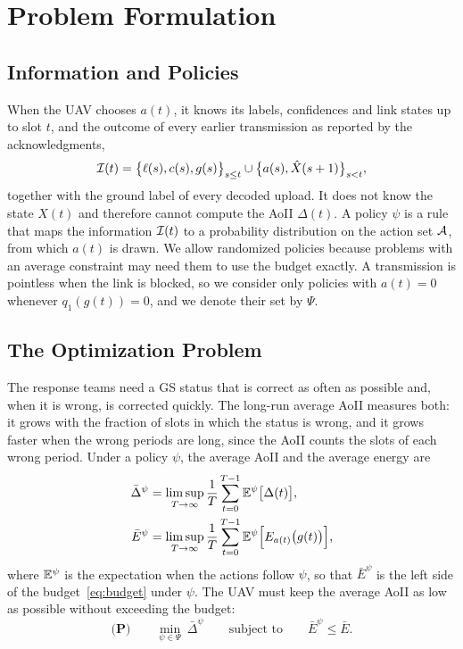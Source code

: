 \section{Problem Formulation}\label{sec:problem}
\subsection{Information and Policies}
When the UAV chooses $a(t)$, it knows its labels, confidences and link states up to slot $t$, and the outcome of every earlier transmission as reported by the acknowledgments,
\begin{equation}\label{eq:info}
\mathcal{I}(t)=\big\{\ell(s),c(s),g(s)\big\}_{s\le t}\cup\big\{a(s),\hat X(s+1)\big\}_{s<t},
\end{equation}
together with the ground label of every decoded upload.
It does not know the state $X(t)$ and therefore cannot compute the AoII $\Delta(t)$. A policy $\psi$ is a rule that maps the information $\mathcal{I}(t)$ to a probability distribution on the action set $\mathcal{A}$, from which $a(t)$ is drawn. We allow randomized policies because problems with an average constraint may need them to use the budget exactly. A transmission is pointless when the link is blocked, so we consider only policies with $a(t)=0$ whenever $q_1(g(t))=0$, and we denote their set by $\Psi$.

\subsection{The Optimization Problem}
The response teams need a GS status that is correct as often as possible and, when it is wrong, is corrected quickly. The long-run average AoII measures both: it grows with the fraction of slots in which the status is wrong, and it grows faster when the wrong periods are long, since the AoII counts the slots of each wrong period. Under a policy $\psi$, the average AoII and the average energy are
\begin{align}
\bar\Delta^{\psi}&=\limsup_{T\to\infty}\frac1T\sum_{t=0}^{T-1}\mathbb{E}^{\psi}\big[\Delta(t)\big],\label{eq:avgaoii}\\
\bar E^{\psi}&=\limsup_{T\to\infty}\frac1T\sum_{t=0}^{T-1}\mathbb{E}^{\psi}\Big[E_{a(t)}\big(g(t)\big)\Big],\label{eq:avgE}
\end{align}
where $\mathbb{E}^{\psi}$ is the expectation when the actions follow $\psi$, so that $\bar E^{\psi}$ is the left side of the budget~\eqref{eq:budget} under $\psi$. The UAV must keep the average AoII as low as possible without exceeding the budget:
\begin{equation}\label{eq:P}
\textbf{(P)}\qquad \min_{\psi\in\Psi}\ \bar\Delta^{\psi}\qquad\text{subject to}\qquad \bar E^{\psi}\le\bar E.
\end{equation}

